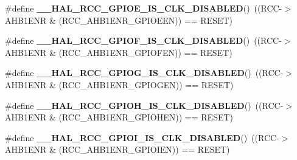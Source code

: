 \begin{DoxyCompactItemize}
\item 
\mbox{\label{group___r_c_c_ex___peripheral___clock___enable___disable___status_ga04deb9fe7c5fad8f1644682c1114613f}} 
\#define {\bfseries \+\_\+\+\_\+\+H\+A\+L\+\_\+\+R\+C\+C\+\_\+\+G\+P\+I\+O\+E\+\_\+\+I\+S\+\_\+\+C\+L\+K\+\_\+\+D\+I\+S\+A\+B\+L\+ED}()~((R\+CC-\/$>$A\+H\+B1\+E\+NR \& (R\+C\+C\+\_\+\+A\+H\+B1\+E\+N\+R\+\_\+\+G\+P\+I\+O\+E\+EN)) == R\+E\+S\+ET)
\item 
\mbox{\label{group___r_c_c_ex___peripheral___clock___enable___disable___status_ga843a7fcc2441b978cadacbea548dff93}} 
\#define {\bfseries \+\_\+\+\_\+\+H\+A\+L\+\_\+\+R\+C\+C\+\_\+\+G\+P\+I\+O\+F\+\_\+\+I\+S\+\_\+\+C\+L\+K\+\_\+\+D\+I\+S\+A\+B\+L\+ED}()~((R\+CC-\/$>$A\+H\+B1\+E\+NR \& (R\+C\+C\+\_\+\+A\+H\+B1\+E\+N\+R\+\_\+\+G\+P\+I\+O\+F\+EN)) == R\+E\+S\+ET)
\item 
\mbox{\label{group___r_c_c_ex___peripheral___clock___enable___disable___status_ga56838183bdecd8b53c8b23bfcad5b28f}} 
\#define {\bfseries \+\_\+\+\_\+\+H\+A\+L\+\_\+\+R\+C\+C\+\_\+\+G\+P\+I\+O\+G\+\_\+\+I\+S\+\_\+\+C\+L\+K\+\_\+\+D\+I\+S\+A\+B\+L\+ED}()~((R\+CC-\/$>$A\+H\+B1\+E\+NR \& (R\+C\+C\+\_\+\+A\+H\+B1\+E\+N\+R\+\_\+\+G\+P\+I\+O\+G\+EN)) == R\+E\+S\+ET)
\item 
\mbox{\label{group___r_c_c_ex___peripheral___clock___enable___disable___status_ga9c405e3a8e5219c98d0262e18bd0eed9}} 
\#define {\bfseries \+\_\+\+\_\+\+H\+A\+L\+\_\+\+R\+C\+C\+\_\+\+G\+P\+I\+O\+H\+\_\+\+I\+S\+\_\+\+C\+L\+K\+\_\+\+D\+I\+S\+A\+B\+L\+ED}()~((R\+CC-\/$>$A\+H\+B1\+E\+NR \& (R\+C\+C\+\_\+\+A\+H\+B1\+E\+N\+R\+\_\+\+G\+P\+I\+O\+H\+EN)) == R\+E\+S\+ET)
\item 
\mbox{\label{group___r_c_c_ex___peripheral___clock___enable___disable___status_ga46d368ee1021d0e9e3939bc714fc5c2b}} 
\#define {\bfseries \+\_\+\+\_\+\+H\+A\+L\+\_\+\+R\+C\+C\+\_\+\+G\+P\+I\+O\+I\+\_\+\+I\+S\+\_\+\+C\+L\+K\+\_\+\+D\+I\+S\+A\+B\+L\+ED}()~((R\+CC-\/$>$A\+H\+B1\+E\+NR \& (R\+C\+C\+\_\+\+A\+H\+B1\+E\+N\+R\+\_\+\+G\+P\+I\+O\+I\+EN)) == R\+E\+S\+ET)

\end{DoxyCompactItemize}
